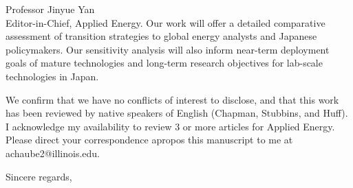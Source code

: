\documentclass[10pt]{letter} %
\begin{document}
\begin{letter}{Professor Jinyue Yan\\
Editor-in-Chief, Applied Energy.}
Our work will offer a detailed comparative assessment of transition strategies to global energy analysts and Japanese policymakers. Our sensitivity analysis will also inform near-term deployment goals of mature technologies and long-term research objectives for lab-scale technologies in Japan.

We confirm that we have no conflicts of interest to disclose, and that this work has been reviewed by native speakers of English (Chapman, Stubbins, and Huff). I acknowledge my availability to review 3 or more articles for Applied Energy. Please direct your correspondence apropos this manuscript to me at achaube2@illinois.edu. 

\closing{Sincere regards,
}


\end{letter}
\end{document}
